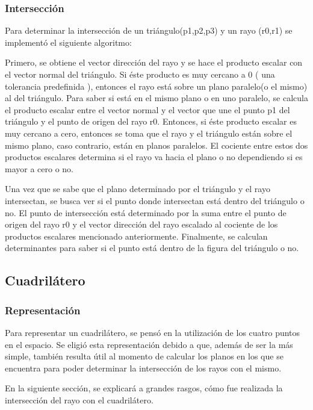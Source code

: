 \documentclass[a4paper,10pt]{article}
\begin{document}
\subsubsection{Intersecci\'on}
Para determinar la intersecci\'on de un tri\'angulo(p1,p2,p3) y un rayo (r0,r1) se implement\'o el siguiente algoritmo:

Primero, se obtiene el vector direcci\'on del rayo y se hace el producto escalar con el vector normal del tri\'angulo. Si \'este
producto es muy cercano a 0 ( una tolerancia predefinida ), entonces el rayo est\'a sobre un plano paralelo(o el mismo) al del tri\'angulo.
Para saber si est\'a en el mismo plano o en uno paralelo, se calcula el producto escalar entre el vector normal y el vector que une
el punto p1 del triángulo y el punto de origen del rayo r0. Entonces, si \'este producto escalar es muy cercano a cero, entonces se toma
que el rayo y el tri\'angulo est\'an sobre el mismo plano, caso contrario, est\'an en planos paralelos. El cociente entre estos dos productos escalares
determina si el rayo va hacia el plano o no dependiendo si es mayor a cero o no.

Una vez que se sabe que el plano determinado por el tri\'angulo y el rayo intersectan, se busca ver si el punto donde intersectan est\'a dentro
del tri\'angulo o no. El punto de intersecci\'on est\'a determinado por la suma entre el punto de origen del rayo r0 y el vector direcci\'on del rayo
escalado al cociente de los productos escalares mencionado anteriormente. Finalmente, se calculan determinantes para saber si el punto est\'a dentro
de la figura del tri\'angulo o no.


\subsection{Cuadril\'atero}

\subsubsection{Representaci\'on}
Para representar un cuadril\'atero, se pens\'o en la utilizaci\'on de los cuatro puntos en el espacio.  Se eligi\'o esta representaci\'on debido a que, adem\'as de ser la m\'as simple, tambi\'en resulta \'util al momento de calcular los planos en los que se encuentra para poder determinar la intersecci\'on de los rayos con el mismo.

En la siguiente secci\'on, se explicar\'a a grandes rasgos, c\'omo fue realizada la intersecci\'on del rayo con el cuadril\'atero.
\end{document}

